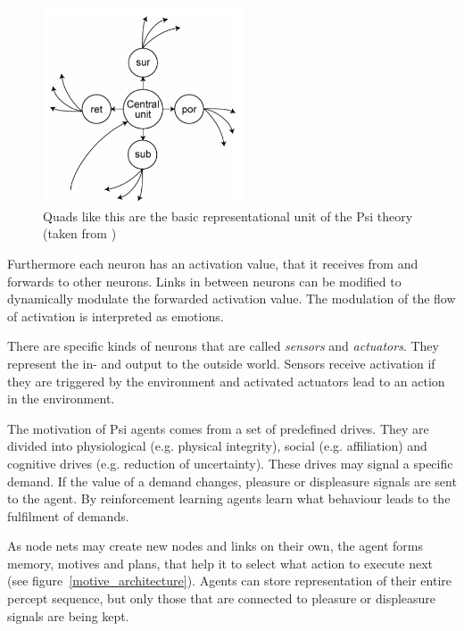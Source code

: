 \begin{figure}[h]
  \centering
    \includegraphics[width=6cm]{graphics/quad}
  \caption{Quads like this are the basic representational unit of the Psi theory (taken from \cite{Bach:2009:PSI:1611304})}
  \label{quad}
\end{figure}

Furthermore each neuron has an activation value, that it receives from and forwards to other neurons. Links in between neurons can be modified to dynamically modulate the forwarded activation value. The modulation of the flow of activation is interpreted as emotions.

There are specific kinds of neurons that are called \emph{sensors} and \emph{actuators}. They represent the in- and output to the outside world. Sensors receive activation if they are triggered by the environment and activated actuators lead to an action in the environment.

The motivation of Psi agents comes from a set of predefined drives. They are divided into physiological (e.g. physical integrity), social (e.g. affiliation) and cognitive drives (e.g. reduction of uncertainty). These drives may signal a specific demand. If the value of a demand changes, pleasure or displeasure signals are sent to the agent. By reinforcement learning agents learn what behaviour leads to the fulfilment of demands. 

As node nets may create new nodes and links on their own, the agent forms memory, motives and plans, that help it to select what action to execute next (see figure~\ref{motive_architecture}). Agents can store representation of their entire percept sequence, but only those that are connected to pleasure or displeasure signals are being kept.

